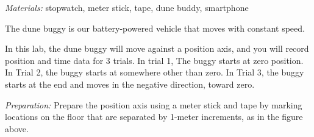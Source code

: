 \documentclass[]{exam}
\begin{document}
\noindent \textit{Materials:} stopwatch, meter stick, tape, dune buddy, smartphone 

\medskip

\noindent The dune buggy is our battery-powered vehicle that moves with constant speed. 

\begin{center}
\end{center}

\medskip

\noindent In this lab, the dune buggy will move against a position axis, and you will record position and time data for 3 trials. In trial 1, The buggy starts at zero position. In Trial 2, the buggy starts at somewhere other than zero. In Trial 3, the buggy starts at the end and moves in the negative direction, toward zero.

\medskip

\noindent \textit{Preparation:} Prepare the position axis using a meter stick and tape by marking locations on the floor that are separated by 1-meter increments, as in the figure above.
\end{document}
